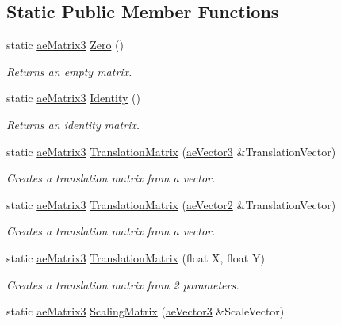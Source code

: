 \subsection*{Static Public Member Functions}
\begin{DoxyCompactItemize}
\item 
static \hyperlink{structae_core_1_1ae_matrix3}{ae\+Matrix3} \hyperlink{structae_core_1_1ae_matrix3_a029f4b68fa7e2901ed65fb0d64e64a18}{Zero} ()
\begin{DoxyCompactList}\small\item\em Returns an empty matrix. \end{DoxyCompactList}\item 
static \hyperlink{structae_core_1_1ae_matrix3}{ae\+Matrix3} \hyperlink{structae_core_1_1ae_matrix3_ab6a48e3b08b761ac11aedcdd706fd846}{Identity} ()
\begin{DoxyCompactList}\small\item\em Returns an identity matrix. \end{DoxyCompactList}\item 
static \hyperlink{structae_core_1_1ae_matrix3}{ae\+Matrix3} \hyperlink{structae_core_1_1ae_matrix3_a334964d8152fe8e1b65efcb60d7c8846}{Translation\+Matrix} (\hyperlink{structae_core_1_1ae_vector3}{ae\+Vector3} \&Translation\+Vector)
\begin{DoxyCompactList}\small\item\em Creates a translation matrix from a vector. \end{DoxyCompactList}\item 
static \hyperlink{structae_core_1_1ae_matrix3}{ae\+Matrix3} \hyperlink{structae_core_1_1ae_matrix3_a46258dc1190c86544355a8dcb1685105}{Translation\+Matrix} (\hyperlink{structae_core_1_1ae_vector2}{ae\+Vector2} \&Translation\+Vector)
\begin{DoxyCompactList}\small\item\em Creates a translation matrix from a vector. \end{DoxyCompactList}\item 
static \hyperlink{structae_core_1_1ae_matrix3}{ae\+Matrix3} \hyperlink{structae_core_1_1ae_matrix3_aceb7b649f9d26fdcac597d231d8054a8}{Translation\+Matrix} (float X, float Y)
\begin{DoxyCompactList}\small\item\em Creates a translation matrix from 2 parameters. \end{DoxyCompactList}\item 
static \hyperlink{structae_core_1_1ae_matrix3}{ae\+Matrix3} \hyperlink{structae_core_1_1ae_matrix3_abaa5cfdac45bc7ce9a61ede3a55891b3}{Scaling\+Matrix} (\hyperlink{structae_core_1_1ae_vector3}{ae\+Vector3} \&Scale\+Vector)

\end{DoxyCompactItemize}
